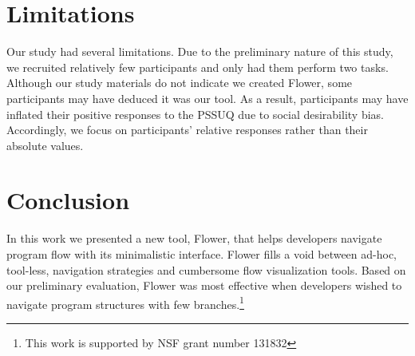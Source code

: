 \documentclass[conference]{IEEEtran}
\begin{document}
	




\section{Limitations}
Our study had several limitations.
Due to the preliminary nature of this study, we recruited relatively few participants and only had them perform two tasks.
Although our study materials do not indicate we created Flower, some participants may have deduced it was our tool.
As a result, participants may have inflated their positive responses to the PSSUQ due to social desirability bias.
Accordingly, we focus on participants' relative responses rather than their absolute values.

\section{Conclusion}

In this work we presented a new tool, Flower, that helps developers navigate program flow with its minimalistic interface. 
Flower  fills a void between ad-hoc, tool-less, navigation strategies and cumbersome flow visualization tools.
Based on our preliminary evaluation, Flower  was most effective when developers wished to navigate program structures with few branches.\footnote{This work is supported by NSF grant number 131832}






\balance




\end{document}

